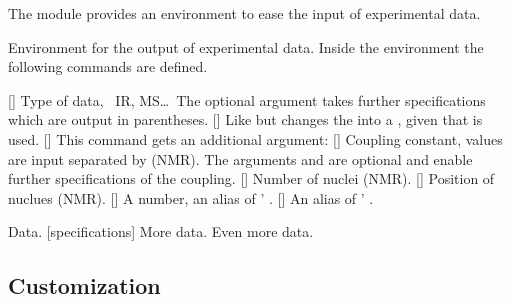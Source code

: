 \documentclass{chemmacros-manual}
\begin{document}
The  module provides an environment to ease the input
of experimental data.
\begin{environments}
    Environment for the output of experimental data.  Inside the environment
    the following commands are defined.
\end{environments}
\begin{commands}
  []
    Type of data, \eg\ IR, MS\ldots\  The optional argument takes further
    specifications which are output in parentheses.
  [\sarg{}]
    Like  but changes the \code{=} into a \code{:}, given that
     is used.
  []
    This command gets an additional argument:
     
  []
    Coupling constant, values are input separated by \code{;} (NMR).  The
    arguments  and  are optional
    and enable further specifications of the coupling.
  \command{\#}[]
    Number of nuclei (NMR).
  []
    Position of nuclues (NMR).
  []
    A number, an alias of ' .
  []
    An alias of ' .
\end{commands}

\begin{example}
  \begin{experimental}
     Data.
    [specifications] More data.
     Even more data.
  \end{experimental}
\end{example}

\subsection{Customization}\label{sec:experimental-customization}
\end{document}
